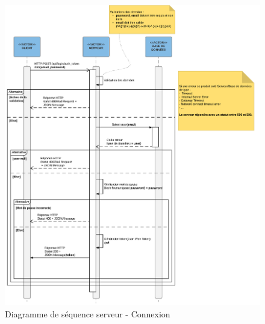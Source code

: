 \documentclass[titlepage]{report}
\begin{document}
\begin{figure}[h]
	\caption{Diagramme de séquence serveur - Connexion}
	\label{annexe_diagramme_sequence_serveur_connexion}
	\centering
	\includegraphics[width=\textwidth]{figures/diagrammes/sequence_serveur_connexion.png}
\end{figure}
\end{document}
